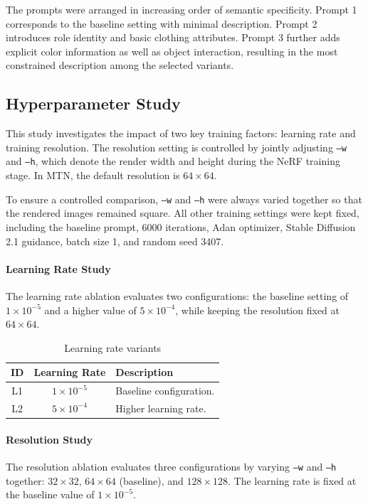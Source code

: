 \documentclass[sigconf, final, screen]{acmart}
\begin{document}
The prompts were arranged in increasing order of semantic specificity. Prompt 1 corresponds to the baseline setting with minimal description. Prompt 2 introduces role identity and basic clothing attributes. Prompt 3 further adds explicit color information as well as object interaction, resulting in the most constrained description among the selected variants.

\subsection{Hyperparameter Study}
This study investigates the impact of two key training factors: learning rate and training resolution. The resolution setting is controlled by jointly adjusting \texttt{--w} and \texttt{--h}, which denote the render width and height during the NeRF training stage. In MTN, the default resolution is $64\times64$.

To ensure a controlled comparison, \texttt{--w} and \texttt{--h} were always varied together so that the rendered images remained square. All other training settings were kept fixed, including the baseline prompt, 6000 iterations, Adan optimizer, Stable Diffusion 2.1 guidance, batch size 1, and random seed 3407.

\paragraph{Learning Rate Study}
The learning rate ablation evaluates two configurations: the baseline setting of $1\times10^{-5}$ and a higher value of $5\times10^{-4}$, while keeping the resolution fixed at $64\times64$.

\begin{table}[h]
\caption{Learning rate variants}
\label{tab:lr_variants}
\centering
\begin{tabularx}{\linewidth}{c c X}
\toprule
ID & Learning Rate & Description \\
\midrule
L1 & $1\times10^{-5}$ & Baseline configuration. \\
L2 & $5\times10^{-4}$ & Higher learning rate. \\
\bottomrule
\end{tabularx}
\end{table}

\paragraph{Resolution Study}
The resolution ablation evaluates three configurations by varying \texttt{--w} and \texttt{--h} together: $32\times32$, $64\times64$ (baseline), and $128\times128$. The learning rate is fixed at the baseline value of $1\times10^{-5}$.
\end{document}
